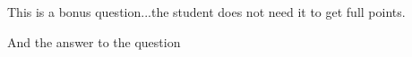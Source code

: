 
\bonusquestion[4]
This is a bonus question...the student does not need it to get full points.

\begin{solution}
And the answer to the question
\end{solution}